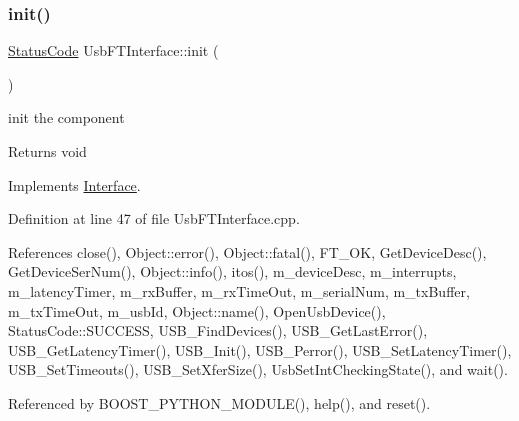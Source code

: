 \subsubsection{\texorpdfstring{init()}{init()}}
{\footnotesize\ttfamily \hyperlink{classStatusCode}{Status\+Code} Usb\+F\+T\+Interface\+::init (\begin{DoxyParamCaption}{ }\end{DoxyParamCaption})\hspace{0.3cm}{\ttfamily [virtual]}}

init the component

\begin{DoxyReturn}{Returns}
void 
\end{DoxyReturn}


Implements \hyperlink{classInterface_a1d095c113b1e89d1f5f68323856fee63}{Interface}.



Definition at line 47 of file Usb\+F\+T\+Interface.\+cpp.



References close(), Object\+::error(), Object\+::fatal(), F\+T\+\_\+\+OK, Get\+Device\+Desc(), Get\+Device\+Ser\+Num(), Object\+::info(), itos(), m\+\_\+device\+Desc, m\+\_\+interrupts, m\+\_\+latency\+Timer, m\+\_\+rx\+Buffer, m\+\_\+rx\+Time\+Out, m\+\_\+serial\+Num, m\+\_\+tx\+Buffer, m\+\_\+tx\+Time\+Out, m\+\_\+usb\+Id, Object\+::name(), Open\+Usb\+Device(), Status\+Code\+::\+S\+U\+C\+C\+E\+SS, U\+S\+B\+\_\+\+Find\+Devices(), U\+S\+B\+\_\+\+Get\+Last\+Error(), U\+S\+B\+\_\+\+Get\+Latency\+Timer(), U\+S\+B\+\_\+\+Init(), U\+S\+B\+\_\+\+Perror(), U\+S\+B\+\_\+\+Set\+Latency\+Timer(), U\+S\+B\+\_\+\+Set\+Timeouts(), U\+S\+B\+\_\+\+Set\+Xfer\+Size(), Usb\+Set\+Int\+Checking\+State(), and wait().



Referenced by B\+O\+O\+S\+T\+\_\+\+P\+Y\+T\+H\+O\+N\+\_\+\+M\+O\+D\+U\+L\+E(), help(), and reset().


